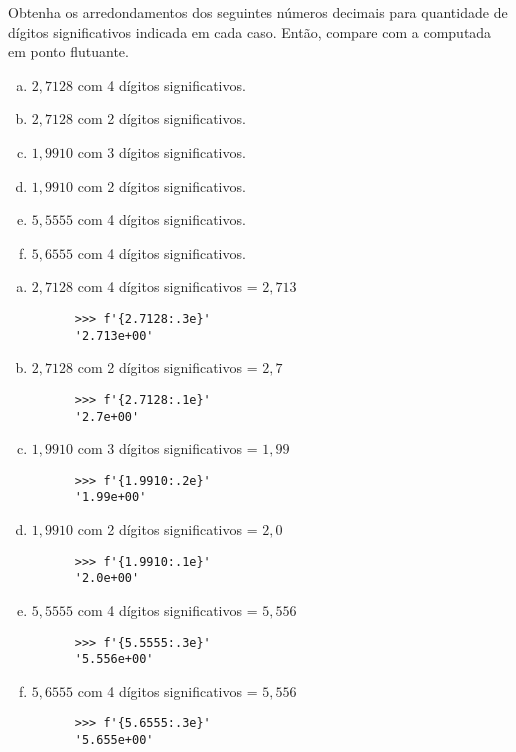 \begin{exeresol}
  Obtenha os arredondamentos dos seguintes números decimais para quantidade de dígitos significativos indicada em cada caso. Então, compare com a computada em ponto flutuante.
  \begin{enumerate}[a)]
  \item $2,7128$ com 4 dígitos significativos.
  \item $2,7128$ com 2 dígitos significativos.
  \item $1,9910$ com 3 dígitos significativos.
  \item $1,9910$ com 2 dígitos significativos.
  \item $5,5555$ com 4 dígitos significativos.
  \item $5,6555$ com 4 dígitos significativos.
  \end{enumerate}
\end{exeresol}
\begin{resol}
  \begin{enumerate}[a)]
  \item $2,7128$ com 4 dígitos significativos = $2,713$
    \begin{lstlisting}
      >>> f'{2.7128:.3e}'
      '2.713e+00'
    \end{lstlisting}
  \item $2,7128$ com 2 dígitos significativos = $2,7$
    \begin{lstlisting}
      >>> f'{2.7128:.1e}'
      '2.7e+00'
    \end{lstlisting}
  \item $1,9910$ com 3 dígitos significativos = $1,99$
    \begin{lstlisting}
      >>> f'{1.9910:.2e}'
      '1.99e+00'
    \end{lstlisting}
  \item $1,9910$ com 2 dígitos significativos = $2,0$
    
    \begin{lstlisting}
      >>> f'{1.9910:.1e}'
      '2.0e+00'
    \end{lstlisting}
        
  \item $5,5555$ com 4 dígitos significativos = $5,556$
    
    \begin{lstlisting}
      >>> f'{5.5555:.3e}'
      '5.556e+00'
    \end{lstlisting}
        
  \item $5,6555$ com 4 dígitos significativos = $5,556$
    
    \begin{lstlisting}
      >>> f'{5.6555:.3e}'
      '5.655e+00'
    \end{lstlisting}
        
  \end{enumerate}
\end{resol}

